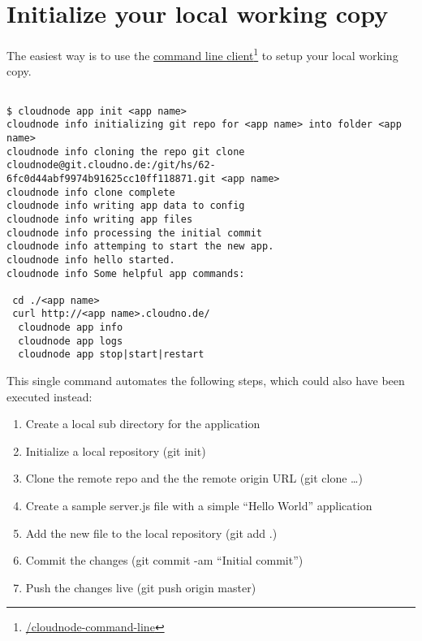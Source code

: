 \section{Initialize your local working copy}
\label{initializeyourlocalworkingcopy}

The easiest way is to use the \href{/cloudnode-command-line}{command line client}\footnote{\href{/cloudnode-command-line}{\slash cloudnode-command-line}} to setup your local working copy.

\begin{adjustwidth}{2.5em}{2.5em}
\begin{verbatim}

$ cloudnode app init <app name>
cloudnode info initializing git repo for <app name> into folder <app name>
cloudnode info cloning the repo git clone cloudnode@git.cloudno.de:/git/hs/62-6fc0d44abf9974b91625cc10ff118871.git <app name>
cloudnode info clone complete
cloudnode info writing app data to config
cloudnode info writing app files
cloudnode info processing the initial commit
cloudnode info attemping to start the new app.
cloudnode info hello started.
cloudnode info Some helpful app commands:

 cd ./<app name>
 curl http://<app name>.cloudno.de/
  cloudnode app info
  cloudnode app logs
  cloudnode app stop|start|restart

\end{verbatim}
\end{adjustwidth}

This single command automates the following steps, which could also have been executed instead:

\begin{enumerate}
\item Create a local sub directory for the application

\item Initialize a local repository (git init)

\item Clone the remote repo and the the remote origin URL (git clone {\ldots})

\item Create a sample server.js file with a simple ``Hello World'' application

\item Add the new file to the local repository (git add .)

\item Commit the changes (git commit -am ``Initial commit'')

\item Push the changes live (git push origin master)

\end{enumerate}

